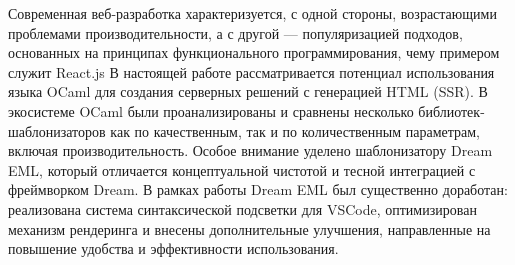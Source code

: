 Современная веб-разработка характеризуется, с одной стороны, возрастающими проблемами производительности, а с другой — популяризацией подходов, основанных на принципах функционального программирования, чему примером служит React.js
В настоящей работе рассматривается потенциал использования языка OCaml для создания серверных решений с генерацией HTML (SSR).
В экосистеме OCaml были проанализированы и сравнены несколько библиотек-шаблонизаторов как по качественным, так и по количественным параметрам, включая производительность.
Особое внимание уделено шаблонизатору Dream EML, который отличается концептуальной чистотой и тесной интеграцией с фреймворком Dream. В рамках работы Dream EML был существенно доработан: реализована система синтаксической подсветки для VSCode, оптимизирован механизм рендеринга и внесены дополнительные улучшения, направленные на повышение удобства и эффективности использования.
